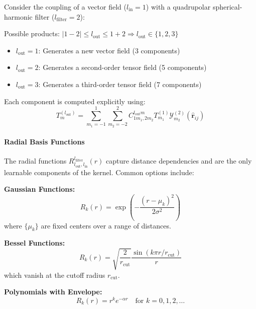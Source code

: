\begin{example}\label{ex:tfn_tensor_product}
Consider the coupling of a vector field ($l_{\text{in}} = 1$) with a quadrupolar spherical-harmonic filter ($l_{\text{filter}} = 2$):

Possible products: $|1 - 2| \leq l_{\text{out}} \leq 1 + 2 \Rightarrow l_{\text{out}} \in \{1, 2, 3\}$

\begin{itemize}
    \item $l_{\text{out}} = 1$: Generates a new vector field (3 components)
    \item $l_{\text{out}} = 2$: Generates a second-order tensor field (5 components)
    \item $l_{\text{out}} = 3$: Generates a third-order tensor field (7 components)
\end{itemize}

Each component is computed explicitly using:
\begin{equation}
T^{(l_{\text{out}})}_m = \sum_{m_1=-1}^{1} \sum_{m_2=-2}^{2} C_{1 m_1, 2 m_2}^{l_{\text{out}} m} T^{(1)}_{m_1} \mathcal{Y}^{(2)}_{m_2}(\hat{\mathbf{r}}_{ij})
\end{equation}
\end{example}

\paragraph{Radial Basis Functions}

The radial functions $R^{l_{\text{filter}}}_{l_{\text{out}}, l_{\text{in}}}(r)$ capture distance dependencies and are the only learnable components of the kernel. Common options include:

\textbf{Gaussian Functions:}
\begin{equation}
R_k(r) = \exp\left(-\frac{(r - \mu_k)^2}{2\sigma^2}\right)
\end{equation}
where $\{\mu_k\}$ are fixed centers over a range of distances.

\textbf{Bessel Functions:}
\begin{equation}
R_k(r) = \sqrt{\frac{2}{r_{\text{cut}}}} \frac{\sin(k\pi r / r_{\text{cut}})}{r}
\end{equation}
which vanish at the cutoff radius $r_{\text{cut}}$.

\textbf{Polynomials with Envelope:}
\begin{equation}
R_k(r) = r^k e^{-\alpha r} \quad \text{for } k = 0, 1, 2, \ldots
\end{equation}

